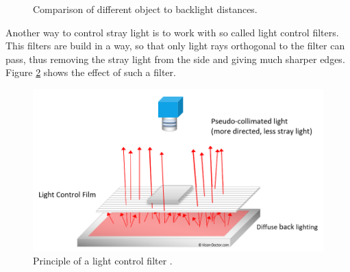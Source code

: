 \begin{figure}[ht]
	\centering
	\caption{Comparison of different object to backlight distances.\label{theory:thre}}	
\end{figure}

Another way to control stray light is to work with so called light control filters.
This filters are build in a way, so that only light rays orthogonal to the filter can pass, thus removing the stray light from the side and giving much sharper edges.
Figure \ref{theory:filter} shows the effect of such a filter.
\begin{figure}[ht]
	\centering
	\includegraphics[width=0.9\linewidth]{2-theory/backlight/Light_Control_Film_principle.png}
	\caption{Principle of a light control filter \cite{filter}.\label{theory:filter}}	
\end{figure}

